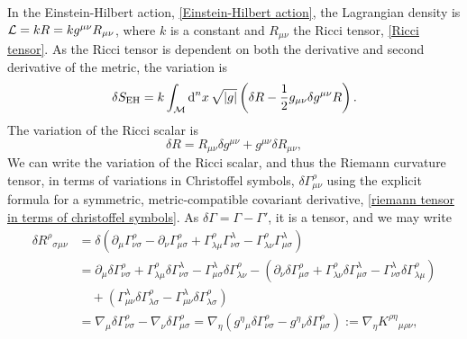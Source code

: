 In the Einstein-Hilbert action, \autoref{Einstein-Hilbert action}, the Lagrangian density is $\mathcal{L} = k R = k g^{\mu \nu} R_{\mu \nu}$, where $k$ is a constant and $R_{\mu \nu}$ the Ricci tensor, \autoref{Ricci tensor}.
As the Ricci tensor is dependent on both the derivative and second derivative of the metric, the variation is
%
\begin{equation}
    \delta S_{\text{EH}} = k \int_{\mathcal{M}} \text{d}^n x \, \sqrt{|g|}
    \left( \delta R - \frac{1}{2} g_{\mu \nu} \delta g^{\mu \nu}  R  \right).
\end{equation}
%
The variation of the Ricci scalar is
%
\begin{equation}
    \delta R = R_{\mu \nu} \delta g^{\mu \nu} + g^{\mu \nu} \delta R_{\mu \nu},
\end{equation}
%
We can write the variation of the Ricci scalar, and thus the Riemann curvature tensor, in terms of variations in Christoffel symbols, $\delta \Gamma^{\rho}_{\mu \nu}$ using the explicit formula for a symmetric, metric-compatible covariant derivative, \autoref{riemann tensor in terms of christoffel symbols}.
As $\delta \Gamma = \Gamma - \Gamma'$, it is a tensor, and we may write
%
\begingroup
\allowdisplaybreaks
\begin{align*}
    \delta R^\rho{}_{\sigma \mu \nu} 
    & = \delta(
        \partial_{\mu} \Gamma^\rho_{\nu \sigma} 
        - \partial_{\nu} \Gamma^\rho_{\mu \sigma}
        + \Gamma^\rho_{\lambda \mu} \Gamma^\lambda_{\nu \sigma}
        - \Gamma^\rho_{\lambda \nu} \Gamma^\lambda_{\mu \sigma}
        )\\
    & = \partial_{\mu} \delta \Gamma^\rho_{\nu \sigma} 
        + \Gamma^\rho_{\lambda \mu}\delta \Gamma^\lambda_{\nu \sigma}
        - \Gamma^\lambda_{\mu \sigma}   \delta \Gamma^\rho_{\lambda \nu}
        - \left( 
            \partial_{\nu} \delta \Gamma^\rho_{\mu \sigma} 
            + \Gamma^\rho_{\lambda \nu}\delta \Gamma^\lambda_{\mu \sigma}
            - \Gamma^\lambda_{\nu \sigma} \delta \Gamma^\rho_{\lambda \mu} 
        \right)
        \\ & \quad
        + (\Gamma^{\lambda}_{\mu\nu}\delta\Gamma^\rho_{\lambda \sigma} 
        - \Gamma^{\lambda}_{\mu\nu}\delta\Gamma^\rho_{\lambda \sigma}) \\
    & = \nabla_{\mu}\delta \Gamma^\rho_{\nu \sigma} 
        - \nabla_{\nu}\delta \Gamma^\rho_{\mu \sigma}
     = \nabla_\eta \left(g^\eta{}_{\mu} \delta\Gamma^\rho_{\nu \sigma} 
        - g^\eta{}_{\nu} \delta\Gamma^\rho_{\mu \sigma} \right) 
    := \nabla_\eta K^{\rho\eta}{}_{\mu \rho \nu},
\end{align*}
